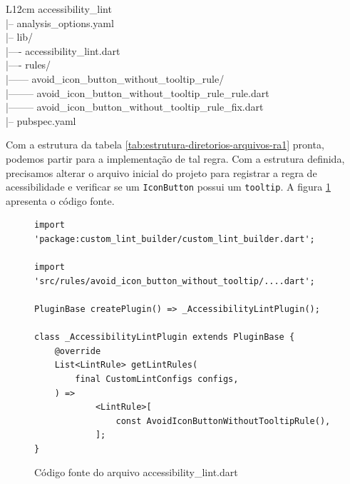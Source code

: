 \begin{table}[!htbp]
	\centering
	\renewcommand{\arraystretch}{1.1}
	\caption{Estrutura de diretórios e arquivos para a regra de acessibilidade \ref{ra:tooltip}}
	\label{tab:estrutura-diretorios-arquivos-ra1}
	\ttfamily
	\begin{tabular}{ L{12cm} }
		\hline
		accessibility\_lint \\
		|-- analysis\_options.yaml \\
		|-- lib/ \\
		|---- accessibility\_lint.dart \\
		|---- rules/ \\
		|------ avoid\_icon\_button\_without\_tooltip\_rule/ \\
		|-------- avoid\_icon\_button\_without\_tooltip\_rule\_rule.dart \\
		|-------- avoid\_icon\_button\_without\_tooltip\_rule\_fix.dart \\
		|-- pubspec.yaml \\
		\hline
	\end{tabular}
	\fontfamily{\rmdefault}\selectfont
	\vspace{2mm}
\end{table}

Com a estrutura da tabela \ref{tab:estrutura-diretorios-arquivos-ra1} pronta, podemos partir para a implementação de tal regra. 
Com a estrutura definida, precisamos alterar o arquivo inicial do projeto  para registrar a regra de acessibilidade e verificar se um \texttt{IconButton} possui um \texttt{tooltip}. A figura \ref{fig:accessibility-lint} apresenta o código fonte.

\begin{figure}[!htbp]
\centering
\caption{Código fonte do arquivo accessibility\_lint.dart}\label{fig:accessibility-lint}
\begin{lstlisting}
import 'package:custom_lint_builder/custom_lint_builder.dart';

import 'src/rules/avoid_icon_button_without_tooltip/....dart';

PluginBase createPlugin() => _AccessibilityLintPlugin();

class _AccessibilityLintPlugin extends PluginBase {
	@override
	List<LintRule> getLintRules(
		final CustomLintConfigs configs,
	) =>
			<LintRule>[
				const AvoidIconButtonWithoutTooltipRule(),
			];
}		
\end{lstlisting}
\vspace{2mm}
\end{figure}

